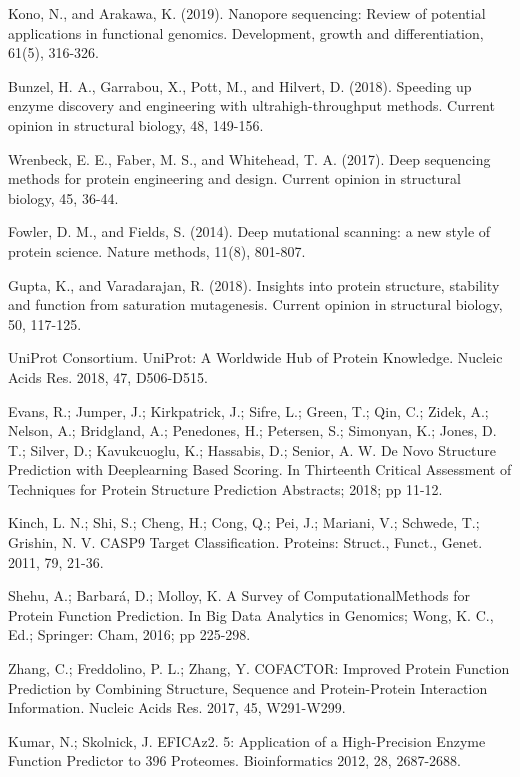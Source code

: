 \documentclass[12pt]{article}
\begin{document}
\begin{thebibliography}{20}
Kono, N., and Arakawa, K. (2019). Nanopore sequencing: Review of potential applications in functional genomics. Development, growth and differentiation, 61(5), 316-326.

 Bunzel, H. A., Garrabou, X., Pott, M., and Hilvert, D. (2018). Speeding up enzyme discovery and engineering with ultrahigh-throughput methods. Current opinion in structural biology, 48, 149-156.

 Wrenbeck, E. E., Faber, M. S., and Whitehead, T. A. (2017). Deep sequencing methods for protein engineering and design. Current opinion in structural biology, 45, 36-44.

 Fowler, D. M., and Fields, S. (2014). Deep mutational scanning: a new style of protein science. Nature methods, 11(8), 801-807.

 Gupta, K., and Varadarajan, R. (2018). Insights into protein structure, stability and function from saturation mutagenesis. Current opinion in structural biology, 50, 117-125.

 UniProt Consortium. UniProt: A Worldwide Hub of Protein Knowledge. Nucleic Acids Res. 2018, 47, D506-D515.

 Evans, R.; Jumper, J.; Kirkpatrick, J.; Sifre, L.; Green, T.; Qin, C.; Zidek, A.; Nelson, A.; Bridgland, A.; Penedones, H.; Petersen, S.; Simonyan, K.; Jones, D. T.; Silver, D.; Kavukcuoglu, K.; Hassabis, D.; Senior, A. W. De Novo Structure Prediction with Deeplearning Based Scoring. In Thirteenth Critical Assessment of Techniques for Protein Structure Prediction Abstracts; 2018; pp 11-12.

 Kinch, L. N.; Shi, S.; Cheng, H.; Cong, Q.; Pei, J.; Mariani, V.; Schwede, T.; Grishin, N. V. CASP9 Target Classification. Proteins: Struct., Funct., Genet. 2011, 79, 21-36.

 Shehu, A.; Barbará, D.; Molloy, K. A Survey of ComputationalMethods for Protein Function Prediction. In Big Data Analytics in Genomics; Wong, K. C., Ed.; Springer: Cham, 2016; pp 225-298.

 Zhang, C.; Freddolino, P. L.; Zhang, Y. COFACTOR: Improved Protein Function Prediction by Combining Structure, Sequence and Protein-Protein Interaction Information. Nucleic Acids Res. 2017, 45, W291-W299.

 Kumar, N.; Skolnick, J. EFICAz2. 5: Application of a High-Precision Enzyme Function Predictor to 396 Proteomes. Bioinformatics 2012, 28, 2687-2688.


\end{thebibliography}
\end{document}
